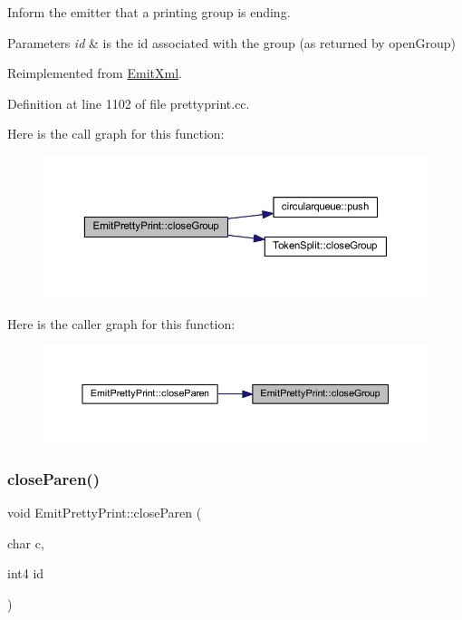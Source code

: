 Inform the emitter that a printing group is ending. 
\begin{DoxyParams}{Parameters}
{\em id} & is the id associated with the group (as returned by open\+Group) \\
\hline
\end{DoxyParams}


Reimplemented from \mbox{\hyperlink{class_emit_xml_ade0028d33afa198f7211e21c9c673231}{Emit\+Xml}}.



Definition at line 1102 of file prettyprint.\+cc.

Here is the call graph for this function\+:
\nopagebreak
\begin{figure}[H]
\begin{center}
\leavevmode
\includegraphics[width=350pt]{class_emit_pretty_print_a3a7553ee225ff54a164108ce0ab55102_cgraph}
\end{center}
\end{figure}
Here is the caller graph for this function\+:
\nopagebreak
\begin{figure}[H]
\begin{center}
\leavevmode
\includegraphics[width=350pt]{class_emit_pretty_print_a3a7553ee225ff54a164108ce0ab55102_icgraph}
\end{center}
\end{figure}
\mbox{\label{class_emit_pretty_print_a83c6f5a16300b7b45526faf1f3c5c7de}} 
\subsubsection{\texorpdfstring{closeParen()}{closeParen()}}
{\footnotesize\ttfamily void Emit\+Pretty\+Print\+::close\+Paren (\begin{DoxyParamCaption}\item[{char}]{c,  }\item[{int4}]{id }\end{DoxyParamCaption})\hspace{0.3cm}{\ttfamily [virtual]}}



